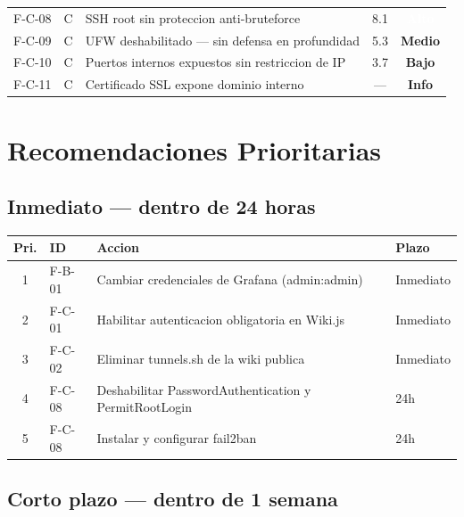 \documentclass[11pt,a4paper]{article}
\begin{document}
\begin{center}
\begin{tabularx}{\textwidth}{llXcc}
F-C-08 & C & SSH root sin proteccion anti-bruteforce           & 8.1  & \cellcolor{high!70}\textcolor{white}{\textbf{Alto}} \\
F-C-09 & C & UFW deshabilitado --- sin defensa en profundidad  & 5.3  & \cellcolor{medium!60}\textbf{Medio} \\
F-C-10 & C & Puertos internos expuestos sin restriccion de IP  & 3.7  & \cellcolor{low!40}\textbf{Bajo} \\
F-C-11 & C & Certificado SSL expone dominio interno            & ---  & \cellcolor{lightgray}\textbf{Info} \\
\bottomrule
\end{tabularx}
\end{center}

\newpage

\section{Recomendaciones Prioritarias}

\subsection*{Inmediato --- dentro de 24 horas}

\begin{center}
\begin{tabularx}{\textwidth}{clXl}
\toprule
\textbf{Pri.} & \textbf{ID} & \textbf{Accion} & \textbf{Plazo} \\
\midrule
1 & F-B-01      & Cambiar credenciales de Grafana (admin:admin)          & Inmediato \\
2 & F-C-01      & Habilitar autenticacion obligatoria en Wiki.js         & Inmediato \\
3 & F-C-02      & Eliminar tunnels.sh de la wiki publica                 & Inmediato \\
4 & F-C-08      & Deshabilitar PasswordAuthentication y PermitRootLogin  & 24h \\
5 & F-C-08      & Instalar y configurar fail2ban                         & 24h \\
\bottomrule
\end{tabularx}
\end{center}

\subsection*{Corto plazo --- dentro de 1 semana}
\end{document}
